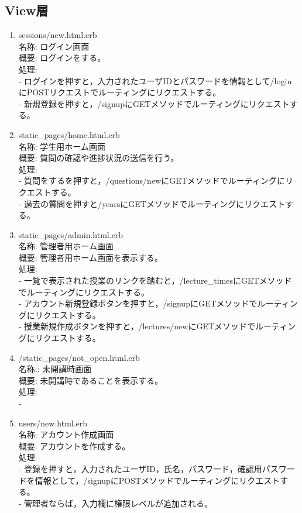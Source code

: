 \newpage
\subsection{View層}
\begin{enumerate}
\item sessions/new.html.erb\\
名称:
ログイン画面\\
概要:
ログインをする。\\
処理:\\
- ログインを押すと，入力されたユーザIDとパスワードを情報として/loginにPOSTリクエストでルーティングにリクエストする。\\
- 新規登録を押すと，/signupにGETメソッドでルーティングにリクエストする。

\item static\_pages/home.html.erb\\
名称:
学生用ホーム画面\\
概要:
質問の確認や進捗状況の送信を行う。\\
処理:\\
- 質問をするを押すと，/questions/newにGETメソッドでルーティングにリクエストする。\\
- 過去の質問を押すと/yearsにGETメソッドでルーティングにリクエストする。

\item static\_pages/admin.html.erb\\
名称:
管理者用ホーム画面\\
概要:
管理者用ホーム画面を表示する。\\
処理:\\
- 一覧で表示された授業のリンクを踏むと，/lecture\_timesにGETメソッドでルーティングにリクエストする。\\
- アカウント新規登録ボタンを押すと，/signupにGETメソッドでルーティングにリクエストする。\\
- 授業新規作成ボタンを押すと，/lectures/newにGETメソッドでルーティングにリクエストする。

\item /static\_pages/not\_open.html.erb\\
名称::
未開講時画面\\
概要:
未開講時であることを表示する。\\
処理:\\
-

\item users/new.html.erb\\
名称:
アカウント作成画面\\
概要:
アカウントを作成する。\\
処理:\\
- 登録を押すと，入力されたユーザID，氏名，パスワード，確認用パスワードを情報として，/signupにPOSTメソッドでルーティングにリクエストする。\\
- 管理者ならば，入力欄に権限レベルが追加される。


\end{enumerate}
